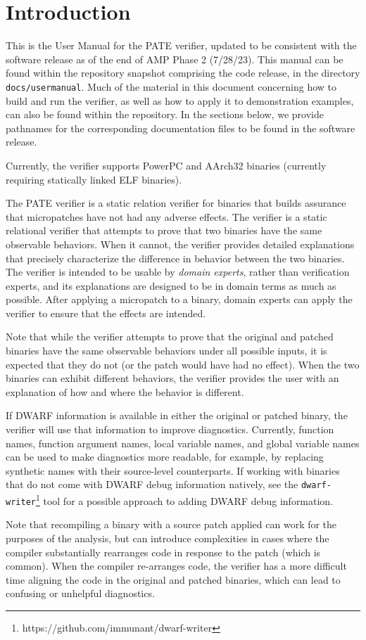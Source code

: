 \section{Introduction}\label{sec:introduction}

This is the User Manual for the PATE verifier, updated to be consistent with the software release as of the end of AMP Phase 2 (7/28/23).
This manual can be found within the repository snapshot comprising the code release, in the directory \texttt{docs/usermanual}.
Much of the material in this document concerning how to build and run the verifier, as well as how to apply it to demonstration examples, can also be found within the repository.
In the sections below, we provide pathnames for the corresponding documentation files to be found in the software release.

Currently, the verifier supports PowerPC and AArch32 binaries (currently requiring statically linked ELF binaries).

The PATE verifier is a static relation verifier for binaries that builds assurance that micropatches have not had any adverse effects.
The verifier is a static relational verifier that attempts to prove that two binaries have the same observable behaviors.
When it cannot, the verifier provides detailed explanations that precisely characterize the difference in behavior between the two binaries.
The verifier is intended to be usable by \emph{domain experts}, rather than verification experts, and its explanations are designed to be in domain terms as much as possible.
After applying a micropatch to a binary, domain experts can apply the verifier to ensure that the effects are intended.

Note that while the verifier attempts to prove that the original and patched binaries have the same observable behaviors under all possible inputs, it is expected that they do not (or the patch would have had no effect).
When the two binaries can exhibit different behaviors, the verifier provides the user with an explanation of how and where the behavior is different.

If DWARF information is available in either the original or patched binary, the verifier will use that information to improve diagnostics.
Currently, function names, function argument names, local variable names, and global variable names can be used to make diagnostics more readable, for example, by replacing synthetic names with their source-level counterparts.
If working with binaries that do not come with DWARF debug information natively, see the \lstinline{dwarf-writer}\footnote{https://github.com/immunant/dwarf-writer} tool for a possible approach to adding DWARF debug information.

Note that recompiling a binary with a source patch applied can work for the purposes of the analysis, but can introduce complexities in cases where the compiler substantially rearranges code in response to the patch (which is common).
When the compiler re-arranges code, the verifier has a more difficult time aligning the code in the original and patched binaries, which can lead to confusing or unhelpful diagnostics.
